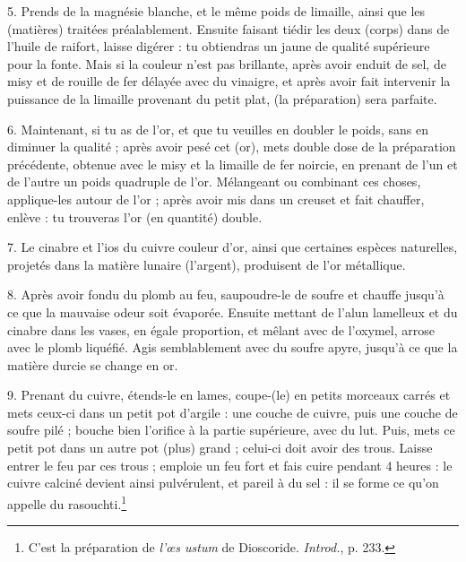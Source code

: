 \documentclass[a4paper, 11pt, oneside, polutonikogreek, french]{article}
\begin{document}
5. Prends de la magnésie blanche, et le même poids de limaille, ainsi que les (matières) traitées préalablement. Ensuite faisant tiédir les deux (corps) dans de l'huile de raifort, laisse digérer : tu obtiendras un jaune de qualité supérieure pour la fonte. Mais si la couleur n'est pas brillante, après avoir enduit de sel, de misy et de rouille de fer délayée avec du vinaigre, et après avoir fait intervenir la puissance de la limaille provenant du petit plat, (la préparation) sera parfaite.

6. Maintenant, si tu as de l'or, et que tu veuilles en doubler le poids, sans en diminuer la qualité ; après avoir pesé cet (or), mets double dose de la préparation précédente, obtenue avec le misy et la limaille de fer noircie, en prenant de l'un et de l'autre un poids quadruple de l'or. Mélangeant ou combinant ces choses, applique-les autour de l'or ; après avoir mis dans un creuset et fait chauffer, enlève : tu trouveras l'or (en quantité) double.

7. Le cinabre et l'ios du cuivre couleur d'or, ainsi que certaines espèces naturelles, projetés dans la matière lunaire (l'argent), produisent de l'or métallique.

8. Après avoir fondu du plomb au feu, saupoudre-le de soufre et chauffe jusqu'à ce que la mauvaise odeur soit évaporée. Ensuite mettant de l'alun lamelleux et du cinabre dans les vases, en égale proportion, et mêlant avec de l'oxymel, arrose avec le plomb liquéfié. Agis semblablement avec du soufre apyre, jusqu'à ce que la matière durcie se change en or.

9. Prenant du cuivre, étends-le en lames, coupe-(le) en petits morceaux carrés et mets ceux-ci dans un petit pot d'argile : une couche de cuivre, puis une couche de soufre pilé ; bouche bien l'orifice à la partie supérieure, avec du lut. Puis, mets ce petit pot dans un autre pot (plus) grand ; celui-ci doit avoir des trous. Laisse entrer le feu par ces trous ; emploie un feu fort et fais cuire pendant 4 heures : le cuivre calciné devient ainsi pulvérulent, et pareil à du sel : il se forme ce qu'on appelle du rasouchti.\footnote{C'est la préparation de \emph{l'œs ustum} de Dioscoride. \emph{Introd.}, p. 233.}
\end{document}

